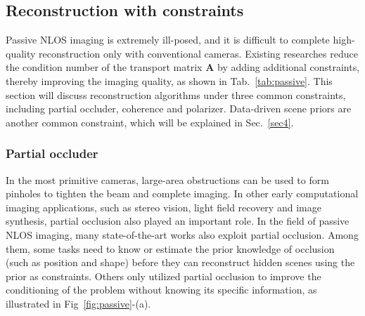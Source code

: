 \subsection{Reconstruction with constraints} \label{memoryEffect1}
Passive NLOS imaging is extremely ill-posed, and it is difficult to complete high-quality reconstruction only with conventional cameras. Existing researches reduce the condition number of the transport matrix $\mathbf{A}$ by adding additional constraints, thereby improving the imaging quality, as shown in Tab.~\ref{tab:passive}. This section will discuss reconstruction algorithms under three common constraints, including partial occluder\cite{saundersComputationalPeriscopyOrdinary2019,yedidiaUsingUnknownOccluders2019}, coherence\cite{beckusMultiModalNonLineofSightPassive2019} and polarizer\cite{tanakaPolarizedNonLineofSightImaging2020}.
Data-driven scene priors are another common constraint, which will be explained in Sec.~\ref{sec4}.


\subsubsection{Partial occluder}
In the most primitive cameras, large-area obstructions can be used to form pinholes to tighten the beam and complete imaging\cite{newhallHistoryPhotography1982}. In other early computational imaging applications, such as stereo vision\cite{andersonRolePartialOcclusion1994}, light field recovery\cite{baradadInferringLightFields2018a,veeraraghavanDappledPhotographyMask2007} and image synthesis\cite{10.1145/1073204.1073257}, partial occlusion also played an important role. 
In the field of passive NLOS imaging, many state-of-the-art works also exploit partial occlusion. Among them, some tasks need to know or estimate the prior knowledge of occlusion (such as position and shape) before they can reconstruct hidden scenes using the prior as constraints\cite{saundersComputationalPeriscopyOrdinary2019}. Others only utilized partial occlusion to improve the conditioning of the problem without knowing its specific information\cite{torralbaAccidentalPinholePinspeck2012,yedidiaUsingUnknownOccluders2019,aittalaComputationalMirrorsBlind2019,seidelTwoDimensionalNonLineofSightScene2020,boumanTurningCornersCameras2017}, as illustrated in Fig~\ref{fig:passive}-(a).

